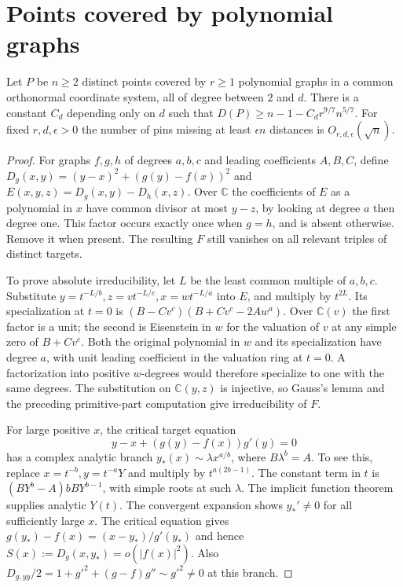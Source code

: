 \section{Points covered by polynomial graphs}

\begin{theorem}[982-P03]
Let \(P\) be \(n\ge2\) distinct points covered by \(r\ge1\) polynomial graphs in a common orthonormal coordinate system, all of degree between \(2\) and \(d\). There is a constant \(C_d\) depending only on \(d\) such that \(D(P)\ge n-1-C_d r^{9/7}n^{5/7}\). For fixed \(r,d,\epsilon>0\) the number of pins missing at least \(\epsilon n\) distances is \(O_{r,d,\epsilon}(\sqrt n)\).
\end{theorem}

\begin{proof}
For graphs \(f,g,h\) of degrees \(a,b,c\) and leading coefficients \(A,B,C\), define \(D_g(x,y)=(y-x)^2+(g(y)-f(x))^2\) and \(E(x,y,z)=D_g(x,y)-D_h(x,z)\). Over \(\mathbb C\) the coefficients of \(E\) as a polynomial in \(x\) have common divisor at most \(y-z\), by looking at degree \(a\) then degree one. This factor occurs exactly once when \(g=h\), and is absent otherwise. Remove it when present. The resulting \(F\) still vanishes on all relevant triples of distinct targets.

To prove absolute irreducibility, let \(L\) be the least common multiple of \(a,b,c\). Substitute \(y=t^{-L/b},z=v t^{-L/c},x=w t^{-L/a}\) into \(E\), and multiply by \(t^{2L}\). Its specialization at \(t=0\) is \((B-Cv^c)(B+Cv^c-2Aw^a)\). Over \(\mathbb C(v)\) the first factor is a unit; the second is Eisenstein in \(w\) for the valuation of \(v\) at any simple zero of \(B+Cv^c\). Both the original polynomial in \(w\) and its specialization have degree \(a\), with unit leading coefficient in the valuation ring at \(t=0\). A factorization into positive \(w\)-degrees would therefore specialize to one with the same degrees. The substitution on \(\mathbb C(y,z)\) is injective, so Gauss's lemma and the preceding primitive-part computation give irreducibility of \(F\).

For large positive \(x\), the critical target equation
\[
 y-x+(g(y)-f(x))g'(y)=0
\]
has a complex analytic branch \(y_*(x)\sim\lambda x^{a/b}\), where \(B\lambda^b=A\). To see this, replace \(x=t^{-b},y=t^{-a}Y\) and multiply by \(t^{a(2b-1)}\). The constant term in \(t\) is \((BY^b-A)bBY^{b-1}\), with simple roots at such \(\lambda\). The implicit function theorem supplies analytic \(Y(t)\). The convergent expansion shows \(y_*'\ne0\) for all sufficiently large \(x\). The critical equation gives \(g(y_*)-f(x)=(x-y_*)/g'(y_*)\) and hence \(S(x):=D_g(x,y_*)=o(|f(x)|^2)\). Also \(D_{g,yy}/2=1+g'^2+(g-f)g''\sim g'^2\ne0\) at this branch.


\end{proof}
